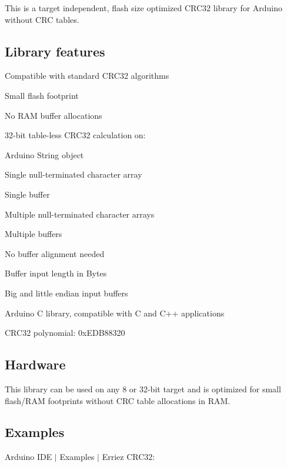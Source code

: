 \href{https://travis-ci.org/Erriez/ErriezCRC32}{\tt }

This is a target independent, flash size optimized C\+R\+C32 library for Arduino without C\+RC tables.



\subsection*{Library features}


\begin{DoxyItemize}
\item Compatible with standard C\+R\+C32 algorithms
\item Small flash footprint
\item No R\+AM buffer allocations
\item 32-\/bit table-\/less C\+R\+C32 calculation on\+:
\begin{DoxyItemize}
\item Arduino String object
\item Single null-\/terminated character array
\item Single buffer
\item Multiple null-\/terminated character arrays
\item Multiple buffers
\end{DoxyItemize}
\item No buffer alignment needed
\item Buffer input length in Bytes
\item Big and little endian input buffers
\item Arduino C library, compatible with C and C++ applications
\item C\+R\+C32 polynomial\+: 0x\+E\+D\+B88320
\end{DoxyItemize}

\subsection*{Hardware}

This library can be used on any 8 or 32-\/bit target and is optimized for small flash/\+R\+AM footprints without C\+RC table allocations in R\+AM.

\subsection*{Examples}

Arduino I\+DE $\vert$ Examples $\vert$ Erriez C\+R\+C32\+:


